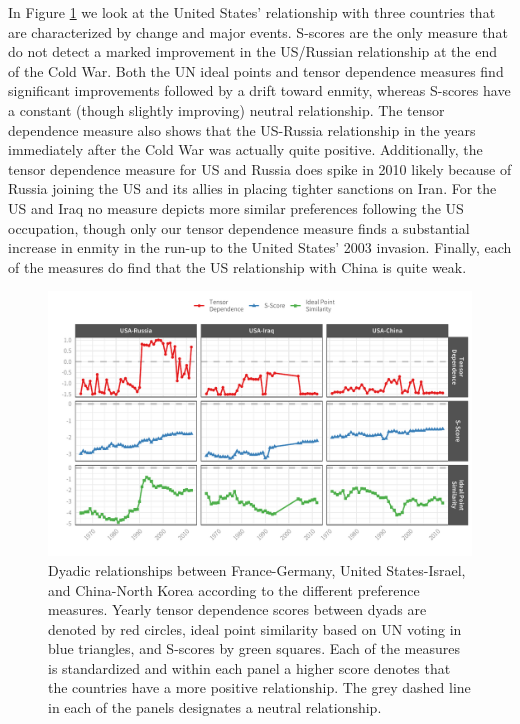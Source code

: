 \documentclass[12pt,pdflatex]{elsarticle}
\begin{document}
In Figure \ref{unfriendly:dyads} we look at the United States' relationship with three countries that are characterized by change and major events. S-scores are the only measure that do not detect a marked improvement in the US/Russian relationship at the end of the Cold War. Both the UN ideal points and tensor dependence measures find significant improvements followed by a drift toward enmity, whereas S-scores have a constant (though slightly improving) neutral relationship. The tensor dependence measure also shows that the US-Russia relationship in the years immediately after the Cold War was actually quite positive. Additionally, the tensor dependence measure for US and Russia does spike in 2010 likely because of Russia joining the US and its allies in placing tighter sanctions on Iran. For the US and Iraq no measure depicts more similar preferences following the US occupation, though only our tensor dependence measure finds a substantial increase in enmity in the run-up to the United States' 2003 invasion. Finally, each of the measures do find that the US relationship with China is quite weak.

\begin{figure}
	\centering
	\includegraphics[width=1\textwidth]{plausPlot_2_border}
	\caption{Dyadic relationships between France-Germany, United States-Israel, and China-North Korea according to the different preference measures. Yearly tensor dependence scores between dyads are denoted by red circles, ideal point similarity based on UN voting in blue triangles, and S-scores by green squares. Each of the measures is standardized and within each panel a higher score denotes that the countries have a more positive relationship. The grey dashed line in each of the panels designates a neutral relationship.}
	\label{unfriendly:dyads}
\end{figure}
\end{document}
